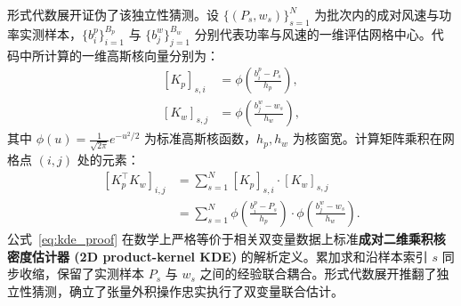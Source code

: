 形式代数展开证伪了该独立性猜测。设 $\{ (P_s, w_s) \}_{s=1}^N$ 为批次内的成对风速与功率实测样本，$\{b_i^p\}_{i=1}^{B_p}$ 与 $\{b_j^w\}_{j=1}^{B_w}$ 分别代表功率与风速的一维评估网格中心。代码中所计算的一维高斯核向量分别为：
\begin{equation}
\begin{aligned}
\left[K_p\right]_{s,i} &= \phi\left( \frac{b_i^p - P_s}{h_p} \right), \\
\left[K_w\right]_{s,j} &= \phi\left( \frac{b_j^w - w_s}{h_w} \right),
\end{aligned}
\label{eq:kernel_eval}
\end{equation}
其中 $\phi(u) = \frac{1}{\sqrt{2\pi}} e^{-u^2/2}$ 为标准高斯核函数，$h_p, h_w$ 为核窗宽。计算矩阵乘积在网格点 $(i,j)$ 处的元素：
\begin{equation}
\begin{aligned}
\left[ K_p^\top K_w \right]_{i,j} &= \sum_{s=1}^N \left[K_p\right]_{s,i} \cdot \left[K_w\right]_{s,j} \\
&= \sum_{s=1}^N \phi\left( \frac{b_i^p - P_s}{h_p} \right) \cdot \phi\left( \frac{b_j^w - w_s}{h_w} \right).
\end{aligned}
\label{eq:kde_proof}
\end{equation}
公式~\eqref{eq:kde_proof} 在数学上严格等价于相关双变量数据上标准\textbf{成对二维乘积核密度估计器 (2D product-kernel KDE)} 的解析定义。累加求和沿样本索引 $s$ 同步收缩，保留了实测样本 $P_s$ 与 $w_s$ 之间的经验联合耦合。形式代数展开推翻了独立性猜测，确立了张量外积操作忠实执行了双变量联合估计。
